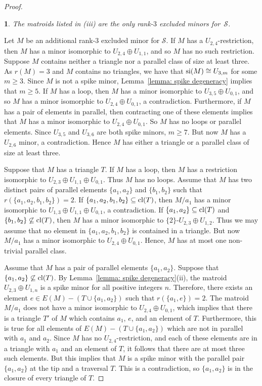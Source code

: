 \documentclass[11pt]{amsart}
\newtheorem{sublemma}{}[theorem]
\numberwithin{equation}{section} %
\newcommand{\cl}{{\rm cl}}
\newcommand{\si}{{\rm si}}
\newcommand{\cS}{\mathcal{S}}
\begin{document}
\begin{proof}
\begin{sublemma}
The matroids listed in (iii) are the only rank-$3$ excluded minors for~$\cS$.
\label{rank3}
\end{sublemma}

Let $M$ be an additional rank-$3$ excluded minor for $\cS$. If $M$ has a $U_{2, 4}$-restriction, then $M$ has a minor isomorphic to $U_{2, 4}\oplus U_{1, 1}$, and so $M$ has no such restriction. Suppose $M$ contains neither a triangle nor a parallel class of size at least three. As $r(M) = 3$ and $M$ contains no triangles, we have that $\si(M)\cong U_{3, m}$ for some $m\geq 3$. Since $M$ is not a spike minor, Lemma~\ref{lemma: spike degeneracy} implies that $m\geq 5$. If $M$ has a loop, then $M$ has a minor isomorphic to $U_{3, 5}\oplus U_{0,1}$, and so $M$ has a minor isomorphic to $U_{2, 4}\oplus U_{0, 1}$, a contradiction. Furthermore, if $M$ has a pair of elements in parallel, then contracting one of these elements implies that $M$ has a minor isomorphic to $U_{2, 4}\oplus U_{0, 1}$. So $M$ has no loops or parallel elements. Since $U_{3, 5}$ and $U_{3, 6}$ are both spike minors, $m\geq 7$. But now $M$ has a $U_{2, 6}$ minor, a contradiction. Hence $M$ has either a triangle or a parallel class of size at least three.

Suppose that $M$ has a triangle $T$. If $M$ has a loop, then $M$ has a restriction isomorphic to $U_{2, 3}\oplus U_{1, 1}\oplus U_{0, 1}$. Thus $M$ has no loops. Assume that $M$ has two distinct pairs of parallel elements $\{a_1, a_2\}$ and $\{b_1, b_2\}$ such that $r(\{a_1, a_2, b_1, b_2\}) = 2$. If $\{a_1, a_2, b_1, b_2\}\subseteq \cl(T)$, then $M/a_1$ has a minor isomorphic to $U_{1, 3}\oplus U_{1, 1}\oplus U_{0, 1}$, a contradiction. If $\{a_1, a_2\}\subseteq \cl(T)$ and $\{b_1, b_2\}\not\subseteq \cl(T)$, then $M$ has a minor isomorphic to $\{2\}$-$U_{2, 3}\oplus U_{1, 2}$. Thus we may assume that no element in $\{a_1, a_2, b_1, b_2\}$ is contained in a triangle. But now $M/ a_1$ has a minor isomorphic to $U_{2, 4}\oplus U_{0, 1}$. Hence, $M$ has at most one non-trivial parallel class.

Assume that $M$ has a pair of parallel elements $\{a_1, a_2\}$. Suppose that $\{a_1, a_2\}\not\subseteq \cl(T)$. By Lemma~\ref{lemma: spike degeneracy}(ii), the matroid $U_{2, 3}\oplus U_{1, n}$ is a spike minor for all positive integers $n$. Therefore, there exists an element $e\in E(M) - (T\cup \{a_1, a_2\})$ such that $r(\{a_1, e\})=2$. The matroid $M / a_1$ does not have a minor isomorphic to $U_{2,4} \oplus U_{0,1}$, which implies that there is a triangle $T'$ of $M$ which contains $a_1$, $e$, and an element of $T$. Furthermore, this is true for all elements of $E(M) - (T \cup \{a_1,a_2\})$ which are not in parallel with $a_1$ and $a_2$. Since $M$ has no $U_{2,4}$-restriction, and each of these elements are in a triangle with $a_1$ and an element of $T$, it follows that there are at most three such elements. But this implies that $M$ is a spike minor with the parallel pair $\{a_1,a_2\}$ at the tip and a traversal $T$. This is a contradiction, so $\{a_1,a_2\}$ is in the closure of every triangle of $T$.


\end{proof}
\end{document}
